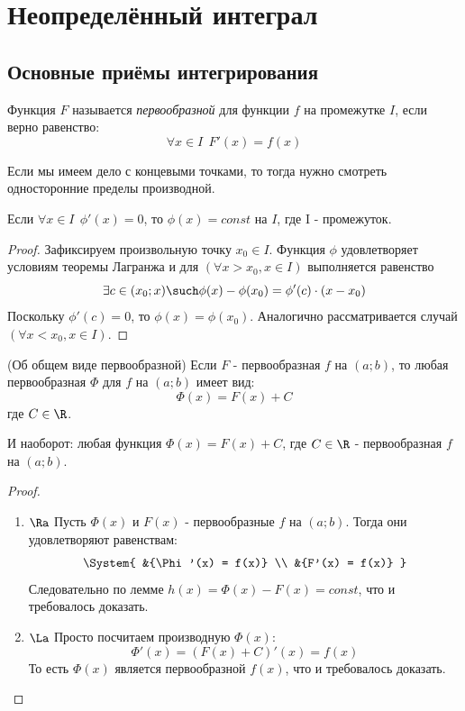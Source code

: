 \section{Неопределённый интеграл}

\subsection{Основные приёмы интегрирования}

\begin{definition}
	Функция $F$ называется \textit{первообразной} для функции $f$ на промежутке $I$, если верно равенство:
	\[
		\forall x \in I\ \ F'(x) = f(x)
	\]
\end{definition}

\begin{note}
	Если мы имеем дело с концевыми точками, то тогда нужно смотреть односторонние пределы производной.
\end{note}

\begin{lemma}
	Если $\forall x \in I\ \ \phi'(x) = 0$, то $\phi(x) = const$ на $I$, где I - промежуток.
\end{lemma}

\begin{proof}
	Зафиксируем произвольную точку $x_0 \in I$. Функция $\phi$ удовлетворяет условиям теоремы Лагранжа и для $(\forall x > x_0, x \in I)$ выполняется равенство
	\[
		\exists c \in (x_0; x) \such \phi(x) - \phi(x_0) = \phi'(c) \cdot (x - x_0)
	\]
	Поскольку $\phi'(c) = 0$, то $\phi(x) = \phi(x_0)$. Аналогично рассматривается случай $(\forall x < x_0, x \in I)$.
\end{proof}

\begin{theorem} (Об общем виде первообразной) \label{commonViewTheorem}
	Если $F$ - первообразная $f$ на $(a; b)$, то любая первообразная $\Phi$ для $f$ на $(a; b)$ имеет вид:
	\[
		\Phi(x) = F(x) + C
	\]
	где $C \in \R$.
	
	И наоборот: любая функция $\Phi(x) = F(x) + C$, где $C \in \R$ - первообразная $f$ на $(a; b)$.
\end{theorem}

\begin{proof}~
	\begin{enumerate}
		\item $\Ra$ Пусть $\Phi(x)$ и $F(x)$ - первообразные $f$ на $(a; b)$. Тогда они удовлетворяют равенствам:
		\[
			\System{
				&{\Phi'(x) = f(x)}
				\\
				&{F'(x) = f(x)}
			}
		\]
		Следовательно по лемме $h(x) = \Phi(x) - F(x) = const$, что и требовалось доказать.
		
		\item $\La$ Просто посчитаем производную $\Phi(x)$:
		\[
			\Phi'(x) = (F(x) + C)'(x) = f(x)
		\]
		То есть $\Phi(x)$ является первообразной $f(x)$, что и требовалось доказать.
	\end{enumerate}
\end{proof}